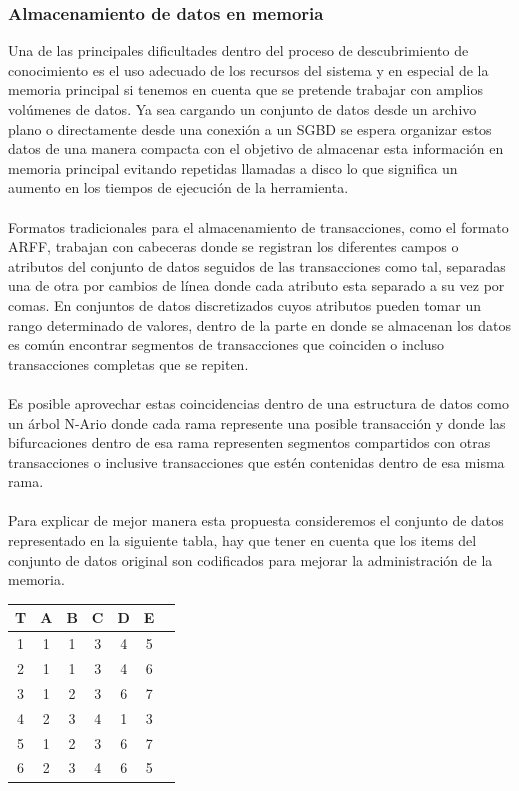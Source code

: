\subsubsection{Almacenamiento de datos en memoria}
Una de las principales dificultades dentro del proceso de descubrimiento de conocimiento es el uso adecuado de
los recursos del sistema y en especial de la memoria principal si tenemos en cuenta que se pretende trabajar con
amplios vol\'umenes de datos.  Ya sea cargando un conjunto de datos desde un archivo plano o directamente desde
una conexi\'on a un SGBD se espera organizar estos datos de una manera compacta con el objetivo de almacenar esta
informaci\'on en memoria principal evitando repetidas llamadas a disco lo que significa un aumento en los tiempos
de ejecuci\'on de la herramienta.\\
\\
Formatos tradicionales para el almacenamiento de transacciones, como el formato ARFF, trabajan con cabeceras
donde se registran los diferentes campos o atributos del conjunto de datos seguidos de las transacciones como tal,
separadas una de otra por cambios de l\'inea donde cada atributo esta separado a su vez por comas. En conjuntos de
datos discretizados cuyos atributos pueden tomar un rango determinado de valores, dentro de la parte en donde se
almacenan los datos es com\'un encontrar segmentos de transacciones que coinciden o incluso transacciones
completas que se repiten.\\
\\
Es posible aprovechar estas coincidencias dentro de una estructura de datos como un \'arbol N-Ario donde cada
rama represente una posible transacci\'on y donde las bifurcaciones dentro de esa rama representen segmentos
compartidos con otras transacciones o inclusive transacciones que est\'en contenidas dentro de esa misma rama.\\
\\
Para explicar de mejor manera esta propuesta consideremos el conjunto de datos representado en la siguiente
tabla, hay que tener en cuenta que los items del conjunto de datos original son codificados para mejorar la
administraci\'on de la memoria.\\

\begin{center}
\begin{tabular}{|c|c|c|c|c|c|c|} \hline
\textbf{T} & \textbf{A} & \textbf{B} & \textbf{C} & \textbf{D} & \textbf{E} \\ \hline
1 & 1 & 1 & 3 & 4 & 5 \\ \hline
2 & 1 & 1 & 3 & 4 & 6 \\ \hline
3 & 1 & 2 & 3 & 6 & 7 \\ \hline
4 & 2 & 3 & 4 & 1 & 3 \\ \hline
5 & 1 & 2 & 3 & 6 & 7 \\ \hline
6 & 2 & 3 & 4 & 6 & 5 \\ \hline
\end{tabular}
\end{center}

